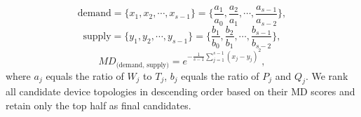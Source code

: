 \documentclass[conference]{IEEEtran}
\begin{document}
\vspace{-1mm}
\begin{equation}
    \text{demand}=\{x_1, x_2, \cdots, x_{s-1}\}=\{\frac{a_1}{a_0},\frac{a_2}{a_1},\cdots,\frac{a_{s-1}}{a_{s-2}}\},
\end{equation}
\begin{equation}
    \text{supply}=\{y_1, y_2, \cdots, y_{s-1}\}=\{\frac{b_1}{b_0},\frac{b_2}{b_1},\cdots,\frac{b_{s-1}}{b_{s-2}}\},
\end{equation}
\begin{equation}
    MD_{\text{(demand, supply)}} = e^{-\frac{1}{s-1}\sum_{j=1}^{s-1}(x_j-y_j)^2},
\end{equation}
where $a_j$ equals the ratio of $W_j$ to $T_j$, $b_j$ equals the ratio of $P_j$ and $Q_j$.
We rank all candidate device topologies in descending order based on their MD scores and retain only the top half as final candidates.
\end{document}
